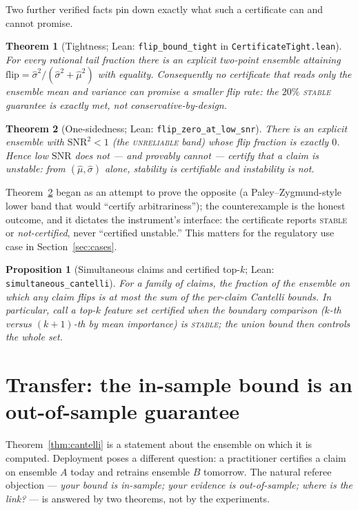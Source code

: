 \documentclass[10pt]{article}
\newtheorem{theorem}{Theorem}
\newtheorem{proposition}{Proposition}
\newcommand{\snr}{\mathrm{SNR}}
\newcommand{\flip}{\mathrm{flip}}
\newcommand{\stab}{\textsc{stable}}
\newcommand{\unrel}{\textsc{unreliable}}
\begin{document}
Two further verified facts pin down exactly what such a certificate can and cannot
promise.

\begin{theorem}[Tightness; Lean: \texttt{flip\_bound\_tight} in
\texttt{CertificateTight.lean}]
\label{thm:tight}
For every rational tail fraction there is an explicit two-point ensemble attaining
$\flip = \hat\sigma^2/(\hat\sigma^2+\hat\mu^2)$ with equality. Consequently no
certificate that reads only the ensemble mean and variance can promise a smaller flip
rate: the $20\%$ \stab{} guarantee is exactly met, not conservative-by-design.
\end{theorem}

\begin{theorem}[One-sidedness; Lean: \texttt{flip\_zero\_at\_low\_snr}]
\label{thm:onesided}
There is an explicit ensemble with $\snr^2 < 1$ (the \unrel{} band) whose flip fraction
is exactly $0$. Hence low $\snr$ does not --- and provably cannot --- certify that a
claim is unstable: from $(\hat\mu,\hat\sigma)$ alone, stability is certifiable and
instability is not.
\end{theorem}

Theorem~\ref{thm:onesided} began as an attempt to prove the opposite (a
Paley--Zygmund-style lower band that would ``certify arbitrariness''); the counterexample
is the honest outcome, and it dictates the instrument's interface: the certificate
reports \stab{} or \emph{not-certified}, never ``certified unstable.'' This matters for
the regulatory use case in Section~\ref{sec:cases}.

\begin{proposition}[Simultaneous claims and certified top-$k$; Lean:
\texttt{simultaneous\_cantelli}]
\label{prop:simul}
For a family of claims, the fraction of the ensemble on which \emph{any} claim flips is
at most the sum of the per-claim Cantelli bounds. In particular, call a top-$k$ feature
set \emph{certified} when the boundary comparison ($k$-th versus $(k{+}1)$-th by mean
importance) is \stab{}; the union bound then controls the whole set.
\end{proposition}

\section{Transfer: the in-sample bound is an out-of-sample guarantee}
\label{sec:transfer}

Theorem~\ref{thm:cantelli} is a statement about the ensemble on which it is computed.
Deployment poses a different question: a practitioner certifies a claim on ensemble $A$
today and retrains ensemble $B$ tomorrow. The natural referee objection --- \emph{your
bound is in-sample; your evidence is out-of-sample; where is the link?} --- is answered
by two theorems, not by the experiments.
\end{document}
